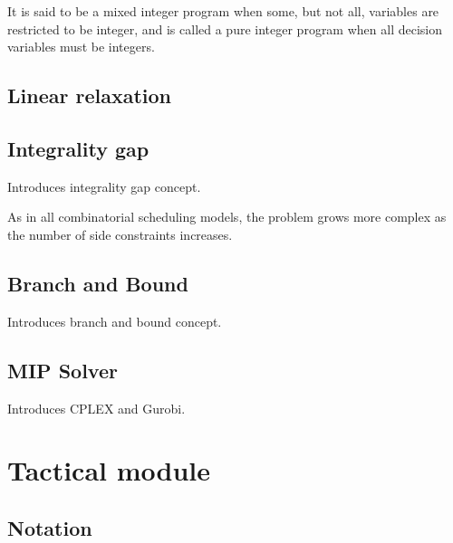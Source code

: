 It is said to be a mixed integer program when some, but not all, variables are restricted to be integer, and is called a pure integer program when all decision variables must be integers.


\subsection{Linear relaxation}


\subsection{Integrality gap}

Introduces integrality gap concept.

As in all combinatorial scheduling models, the problem grows more complex as the number of side constraints increases.


\subsection{Branch and Bound}

Introduces branch and bound concept.


\subsection{MIP Solver}

Introduces CPLEX and Gurobi.




\section{Tactical module}


\subsection{Notation}

